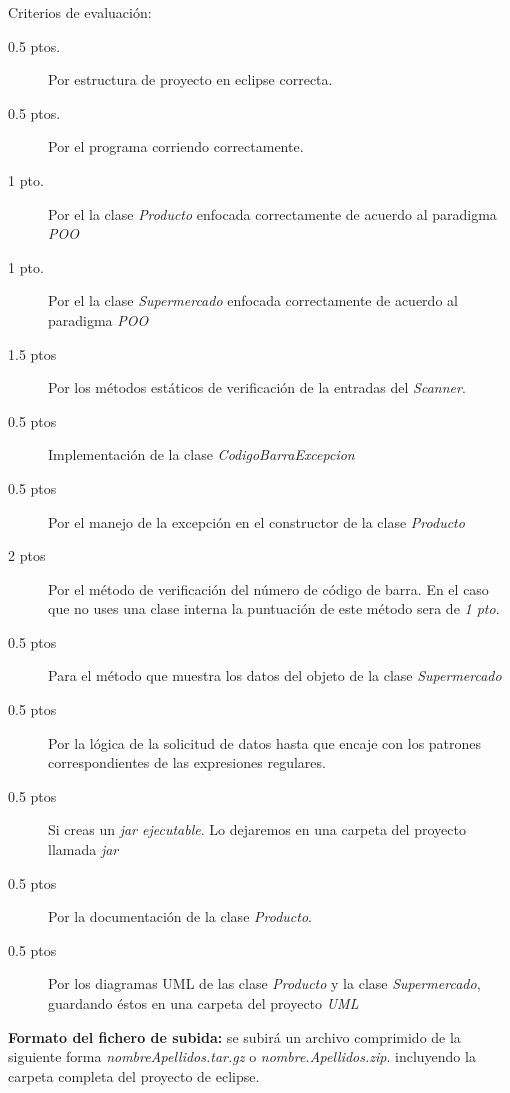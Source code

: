 \documentclass[addpoints,12pt]{exam}
\begin{document}
\begin{questions}
Criterios de evaluación:
\begin{description}
\item[0.5 ptos.] Por estructura de proyecto en eclipse correcta.
\item[0.5 ptos.] Por el programa corriendo correctamente.
\item[1 pto.] Por el la clase \emph{Producto} enfocada correctamente de acuerdo al paradigma \emph{POO}
\item[1 pto.] Por el la clase \emph{Supermercado} enfocada correctamente de acuerdo al paradigma \emph{POO}
\item[1.5 ptos] Por los métodos estáticos de verificación de la entradas del \emph{Scanner}.
\item[0.5 ptos] Implementación de la clase \emph{CodigoBarraExcepcion}
\item[0.5 ptos] Por el manejo de la excepción en el constructor de la clase \emph{Producto}
\item[2 ptos] Por el método de verificación del número de código de barra. En el caso que no uses una clase interna la puntuación de este método sera de \emph{1 pto}.
\item[0.5 ptos] Para el método que muestra los datos del objeto de la clase \emph{Supermercado}
\item[0.5 ptos] Por la lógica de la solicitud de datos hasta que encaje con los patrones correspondientes de las expresiones regulares.
\item[0.5 ptos] Si creas un \emph{jar ejecutable}. Lo dejaremos en una carpeta del proyecto llamada \emph{jar}
\item[0.5 ptos] Por la documentación de la clase \emph{Producto}. 
\item[0.5 ptos] Por los diagramas UML de las clase \emph{Producto} y la clase \emph{Supermercado}, guardando éstos en una carpeta del proyecto \emph{UML}
\end{description}
\textbf{Formato del fichero de subida:} se subirá un archivo comprimido de la siguiente forma \emph{nombreApellidos.tar.gz} o \emph{nombre.Apellidos.zip}. incluyendo la carpeta completa del proyecto de eclipse.
\end{questions}
\end{document}
